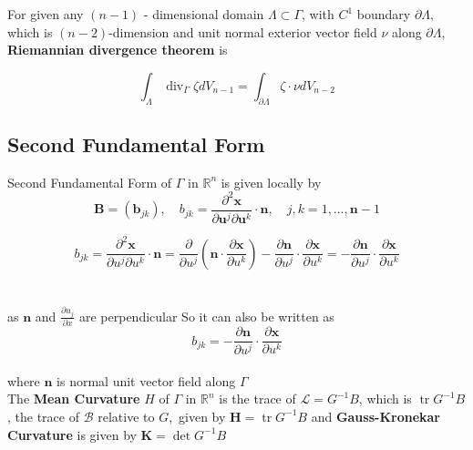 \documentclass[oneside]{book}
\begin{document}
    
    
    
      For given any $(n-1)$ - dimensional domain $\Lambda \subset \Gamma$,  with $C^{1}$ boundary $\partial \Lambda,$ which is $(n-2)$-dimension and unit normal exterior vector field $\nu$ along $\partial \Lambda$, \textbf{Riemannian divergence theorem} is 
      
        \begin{equation}
        \label{eq20}  
     \int_{\Lambda} \operatorname{div}_{\Gamma} \zeta d V_{n-1}=\int_{\partial \Lambda} \zeta \cdot \nu d V_{n-2}
        \end{equation}
      
      
      \subsection{Second Fundamental Form}
      \label{ss:14} Second Fundamental Form of $\Gamma$ in $\mathbb{R}^{n}$ is given locally by 
        \begin{equation}
        \label{eq21}  
      \boldsymbol{B}=\left(\boldsymbol{b}_{j k}\right), \quad b_{j k}=\frac{\partial^{2} \mathbf{x}}{\partial \boldsymbol{u}^{j} \partial \boldsymbol{u}^{k}} \cdot \mathbf{n}, \quad j, k=1, \ldots, \boldsymbol{n}-1 
        \end{equation}
      
      $$b_{j k}=\frac{\partial^{2} \mathbf{x}}{\partial u^{j} \partial u^{k}} \cdot \mathbf{n}=\frac{\partial}{\partial u^{j}}\left(\mathbf{n} \cdot \frac{\partial \mathbf{x}}{\partial u^{k}}\right)-\frac{\partial \mathbf{n}}{\partial u^{j}} \cdot \frac{\partial \mathbf{x}}{\partial u^{k}}=-\frac{\partial \mathbf{n}}{\partial u^{j}} \cdot \frac{\partial \mathbf{x}}{\partial u^{k}}$$ \\\\
      
      
       as $\boldsymbol{n}$ and $\frac{\partial u_{j}}{\partial x} $ are perpendicular
      So it can also be written as 
        \begin{equation}
        \label{eq22}  
       b_{j k} = -\frac{\partial \mathbf{n}}{\partial u^{j}} \cdot \frac{\partial \mathbf{x}}{\partial u^{k}}         \end{equation} \\
       where $\mathbf{n}$ is normal unit vector field along $\Gamma$ \\

      
      The \textbf{Mean Curvature} $H$ of $\Gamma$ in $\mathbb{R}^{n}$ is the trace of $\mathcal{L} = G^{-1} B$, which is $\operatorname{tr} G^{-1} B$, the trace of $\mathcal{B}$ relative
to $G,$ given by
$
\boldsymbol{H}=\operatorname{tr} G^{-1} B
$ and \textbf{Gauss-Kronekar Curvature} is given by $\boldsymbol{K}=\operatorname{det} {G}^{-1} {B}$
\end{document}
